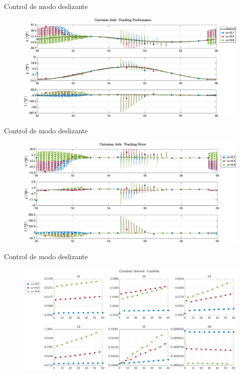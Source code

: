 \documentclass[10pt]{beamer} %
\begin{document}
	

	\begin{frame}[fragile]{Control de modo deslizante}
		\begin{figure}
			\centering
			\hspace*{-0.5cm}\includegraphics[width=1.1\textwidth]{img/SMCi/circular_traj/60_seg/articular_SMCi_jerk_xyz_compare.eps}
		\end{figure}
	\end{frame}
	
	\begin{frame}[fragile]{Control de modo deslizante}
		\begin{figure}
			\centering
			\hspace*{-0.5cm}\includegraphics[width=1.1\textwidth]{img/SMCi/circular_traj/60_seg/articular_SMCi_jerk_xyz_error_compare.eps}
		\end{figure}
	\end{frame}
	
	\begin{frame}[fragile]{Control de modo deslizante}
		\begin{figure}
			\centering
			\hspace*{-0.5cm}\includegraphics[width=1.1\textwidth]{img/SMCi/circular_traj/60_seg/articular_SMCi_lambda_compare.eps}
		\end{figure}
	\end{frame}
	
\end{document}
